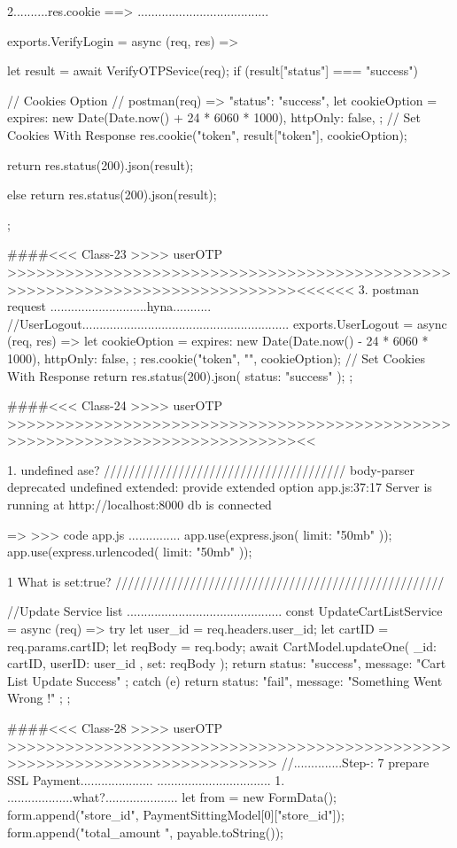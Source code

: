 2..........res.cookie ==> ......................................

exports.VerifyLogin = async (req, res) => {
  let result = await VerifyOTPSevice(req);
  if (result["status"] === "success") {
    // Cookies Option // postman(req) =>  "status": "success",
    let cookieOption = {
      expires: new Date(Date.now() + 24 * 6060 * 1000),
      httpOnly: false,
    };
    // Set Cookies With Response
    res.cookie("token", result["token"], cookieOption); 

    return res.status(200).json(result);
  } else {
    return res.status(200).json(result);
  }
};

####<<< Class-23 >>>> userOTP >>>>>>>>>>>>>>>>>>>>>>>>>>>>>>>>>>>>>>>>>>>>>>>>>>>>>>>>>>>>>>>>>>>>>>>>>>>><<<<<<
3. postman request ............................hyna...........
//UserLogout............................................................
exports.UserLogout = async (req, res) => {
  let cookieOption = {
    expires: new Date(Date.now() - 24 * 6060 * 1000),
    httpOnly: false,
  };
  res.cookie("token", "", cookieOption); // Set Cookies With Response
  return res.status(200).json({ status: "success" });
};

####<<< Class-24 >>>> userOTP >>>>>>>>>>>>>>>>>>>>>>>>>>>>>>>>>>>>>>>>>>>>>>>>>>>>>>>>>>>>>>>>>>>>>>>>>>>><<

1. undefined ase? ///////////////////////////////////////
body-parser deprecated undefined extended: provide extended option app.js:37:17
Server is running at http://localhost:8000
db is connected

=> >>> code app.js ...............
app.use(express.json({ limit: "50mb" }));
app.use(express.urlencoded({ limit: "50mb" }));

1 What is set:true?  /////////////////////////////////////////////////////

//Update Service list .............................................
const UpdateCartListService = async (req) => {
  try {
    let user_id = req.headers.user_id;
    let cartID = req.params.cartID;
    let reqBody = req.body;
    await CartModel.updateOne(
      { _id: cartID, userID: user_id },
      { set: reqBody }
    );
    return { status: "success", message: "Cart List Update Success" };
  } catch (e) {
    return { status: "fail", message: "Something Went Wrong !" };
  }
};


####<<< Class-28 >>>> userOTP >>>>>>>>>>>>>>>>>>>>>>>>>>>>>>>>>>>>>>>>>>>>>>>>>>>>>>>>>>>>>>>>>>>>>>>>>>
//..............Step-: 7 prepare SSL Payment..................... .................................
1. ...................what?.....................
let from = new FormData();
form.append("store_id", PaymentSittingModel[0]["store_id"]);
form.append("total_amount	", payable.toString());

